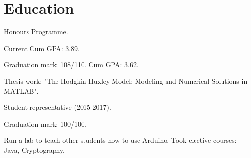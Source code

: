 \documentclass[a4paper]{deedy-resume} %
\begin{document}
\hfill
%
%
\begin{minipage}[t]{0.66\textwidth} %


\section{Education}


\vspace{\topsep} %
\begin{tightitemize}
\item Honours Programme.
\item Current Cum GPA: 3.89.
\end{tightitemize}

\sectionspace %



\begin{tightitemize}
\item Graduation mark: 108/110. Cum GPA: 3.62.
\item Thesis work: "The Hodgkin-Huxley Model: Modeling and Numerical Solutions in MATLAB".
\item Student representative (2015-2017).
\end{tightitemize}

\sectionspace %



\begin{tightitemize}
	\item Graduation mark: 100/100.
	\item Run a lab to teach other students how to use Arduino. Took elective courses: Java, Cryptography.


\end{tightitemize}
\end{minipage}
\end{document}
